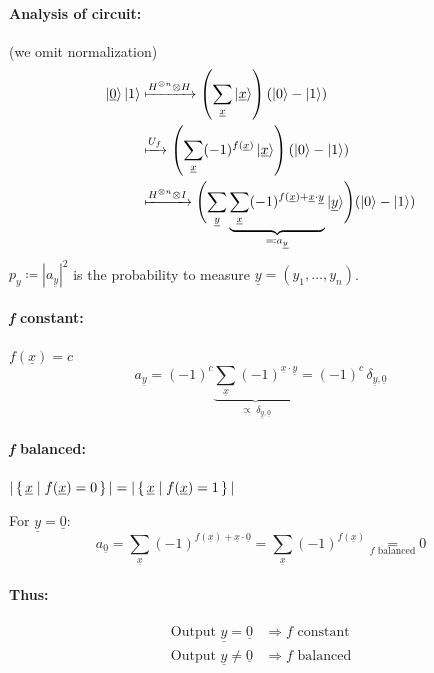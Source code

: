 \documentclass[a4paper, 12pt]{article}
\theoremstyle{plain}
\theoremstyle{definition}
\theoremstyle{remark}
\begin{document}
  \paragraph{Analysis of circuit:} {\small(we omit normalization)}
  \begin{align*}
    \ket{\underline{0}}\ket{1} &\xmapsto{H^{\otimes n}\otimes H} \left(\sum_{\underline{x}}\ket{\underline{x}}\right)(\ket{0}-\ket{1})\\
    &\xmapsto{U_f} \left(\sum_{\underline{x}}(-1)^{f(\underline{x})}\ket{\underline{x}}\right)(\ket{0}-\ket{1})\\
    &\xmapsto{H^{\otimes n}\otimes I} \Biggl(\sum_{\underline{y}}\underbrace{\sum_{\underline{x}}(-1)^{f(\underline{x})+\underline{x}\cdot \underline{y}}}_{\eqcolon a_{\underline{y}}}\ket{\underline{y}}\Biggr)(\ket{0}-\ket{1})\\
  \end{align*}
  $p_y\coloneq |a_{\underline{y}}|^2$ is the probability to measure $\underline{y}=(y_1, \ldots, y_n)$.

  \paragraph{{\emph{f} constant:}} $f(\underline{x})=c$
  \begin{equation*}
    a_{\underline{y}} = (-1)^{c}\underbrace{\sum_{\underline{x}}(-1)^{\underline{x}\cdot \underline{y}}}_{\propto \; \delta_{\underline{y}, \underline{0}}} = (-1)^{c}\,\delta_{\underline{y},\underline{0}}
  \end{equation*}

  \paragraph{{\emph{f} balanced:}} $|\set{\underline{x}|f(\underline{x})=0}|=|\set{\underline{x}|f(\underline{x})=1}|$

  For $\underline{y}=\underline{0}$:
  \begin{equation*}
    a_{\underline{0}} = \sum_{\underline{x}}(-1)^{f(\underline{x})+\underline{x}\cdot \underline{0}} = \sum_{\underline{x}}(-1)^{f(\underline{x})} \underset{\scriptscriptstyle f \text{ balanced}}{=} 0
  \end{equation*}

  \paragraph{Thus:}
  \begin{align*}
    \text{Output } \underline{y}=\underline{0} &\Longrightarrow f \text{ constant} \\
    \text{Output } \underline{y}\neq\underline{0} &\Longrightarrow f \text{ balanced}
  \end{align*}
\end{document}

